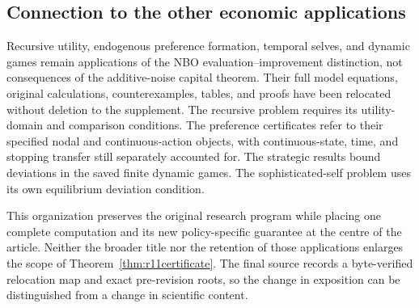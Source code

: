 \subsection{Connection to the other economic applications}\label{sec:r11applications}
Recursive utility, endogenous preference formation, temporal selves, and dynamic games remain applications of the NBO evaluation--improvement distinction, not consequences of the additive-noise capital theorem. Their full model equations, original calculations, counterexamples, tables, and proofs have been relocated without deletion to the supplement. The recursive problem requires its utility-domain and comparison conditions. The preference certificates refer to their specified nodal and continuous-action objects, with continuous-state, time, and stopping transfer still separately accounted for. The strategic results bound deviations in the saved finite dynamic games. The sophisticated-self problem uses its own equilibrium deviation condition.

This organization preserves the original research program while placing one complete computation and its new policy-specific guarantee at the centre of the article. Neither the broader title nor the retention of those applications enlarges the scope of Theorem~\ref{thm:r11certificate}. The final source records a byte-verified relocation map and exact pre-revision roots, so the change in exposition can be distinguished from a change in scientific content.
